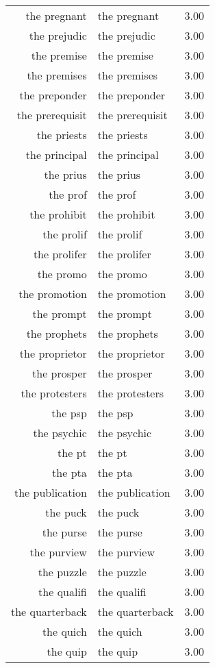 \begin{table}[ht]
\begin{tabular}{rlr}
  the pregnant & the pregnant & 3.00 \\ 
  the prejudic & the prejudic & 3.00 \\ 
  the premise & the premise & 3.00 \\ 
  the premises & the premises & 3.00 \\ 
  the preponder & the preponder & 3.00 \\ 
  the prerequisit & the prerequisit & 3.00 \\ 
  the priests & the priests & 3.00 \\ 
  the principal & the principal & 3.00 \\ 
  the prius & the prius & 3.00 \\ 
  the prof & the prof & 3.00 \\ 
  the prohibit & the prohibit & 3.00 \\ 
  the prolif & the prolif & 3.00 \\ 
  the prolifer & the prolifer & 3.00 \\ 
  the promo & the promo & 3.00 \\ 
  the promotion & the promotion & 3.00 \\ 
  the prompt & the prompt & 3.00 \\ 
  the prophets & the prophets & 3.00 \\ 
  the proprietor & the proprietor & 3.00 \\ 
  the prosper & the prosper & 3.00 \\ 
  the protesters & the protesters & 3.00 \\ 
  the psp & the psp & 3.00 \\ 
  the psychic & the psychic & 3.00 \\ 
  the pt & the pt & 3.00 \\ 
  the pta & the pta & 3.00 \\ 
  the publication & the publication & 3.00 \\ 
  the puck & the puck & 3.00 \\ 
  the purse & the purse & 3.00 \\ 
  the purview & the purview & 3.00 \\ 
  the puzzle & the puzzle & 3.00 \\ 
  the qualifi & the qualifi & 3.00 \\ 
  the quarterback & the quarterback & 3.00 \\ 
  the quich & the quich & 3.00 \\ 
  the quip & the quip & 3.00 \\ 

\end{tabular}
\end{table}
